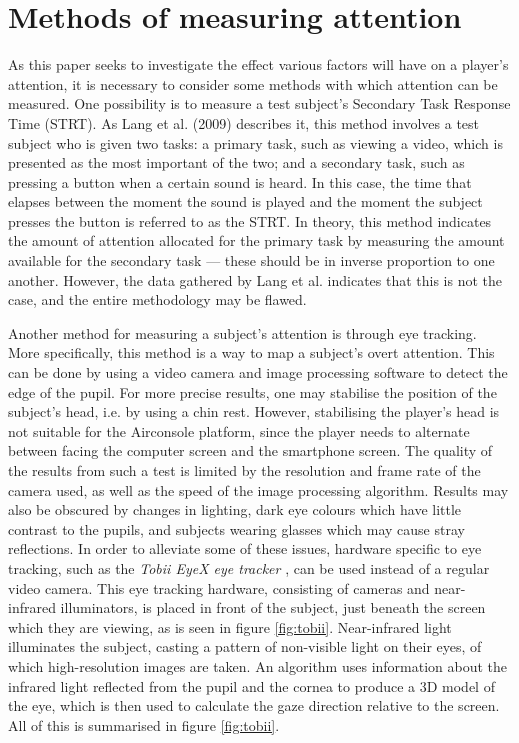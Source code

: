 \section{Methods of measuring attention}\label{sec:measurement}
As this paper seeks to investigate the effect various factors will have on a player’s attention, it is necessary to consider some methods with which attention can be measured. One possibility is to measure a test subject’s Secondary Task Response Time (STRT). As Lang et al. (2009) \cite{Lang2009} describes it, this method involves a test subject who is given two tasks: a primary task, such as viewing a video, which is presented as the most important of the two; and a secondary task, such as pressing a button when a certain sound is heard. In this case, the time that elapses between the moment the sound is played and the moment the subject presses the button is referred to as the STRT. In theory, this method indicates the amount of attention allocated for the primary task by measuring the amount available for the secondary task --- these should be in inverse proportion to one another. However, the data gathered by Lang et al. indicates that this is not the case, and the entire methodology may be flawed.

Another method for measuring a subject’s attention is through eye tracking. More specifically, this method is a way to map a subject’s overt attention. This can be done by using a video camera and image processing software to detect the edge of the pupil. For more precise results, one may stabilise the position of the subject’s head, i.e. by using a chin rest. However, stabilising the player’s head is not suitable for the Airconsole platform, since the player needs to alternate between facing the computer screen and the smartphone screen. The quality of the results from such a test is limited by the resolution and frame rate of the camera used, as well as the speed of the image processing algorithm. Results may also be obscured by changes in lighting, dark eye colours which have little contrast to the pupils, and subjects wearing glasses which may cause stray reflections. In order to alleviate some of these issues, hardware specific to eye tracking, such as the \textit{Tobii EyeX eye tracker} \cite{TobiiPro}, can be used instead of a regular video camera. This eye tracking hardware, consisting of cameras and near-infrared illuminators, is placed in front of the subject, just beneath the screen which they are viewing, as is seen in figure \ref{fig:tobii}. Near-infrared light illuminates the subject, casting a pattern of non-visible light on their eyes, of which high-resolution images are taken. An algorithm uses information about the infrared light reflected from the pupil and the cornea to produce a 3D model of the eye, which is then used to calculate the gaze direction relative to the screen. All of this is summarised in figure \ref{fig:tobii}.

